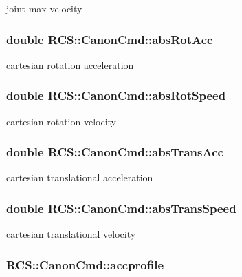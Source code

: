 joint max velocity \hypertarget{structRCS_1_1CanonCmd_ae1abe3a2d6c4c54776ad46738b3bf571}{
\subsubsection[{abs\-Rot\-Acc}]{\setlength{\rightskip}{0pt plus 5cm}double R\-C\-S\-::\-Canon\-Cmd\-::abs\-Rot\-Acc}}\label{structRCS_1_1CanonCmd_ae1abe3a2d6c4c54776ad46738b3bf571}
cartesian rotation acceleration \hypertarget{structRCS_1_1CanonCmd_ad7ce99c4f8d61314aef30c376ace79b7}{
\subsubsection[{abs\-Rot\-Speed}]{\setlength{\rightskip}{0pt plus 5cm}double R\-C\-S\-::\-Canon\-Cmd\-::abs\-Rot\-Speed}}\label{structRCS_1_1CanonCmd_ad7ce99c4f8d61314aef30c376ace79b7}
cartesian rotation velocity \hypertarget{structRCS_1_1CanonCmd_a129e91d931073194c3baaed83f56373e}{
\subsubsection[{abs\-Trans\-Acc}]{\setlength{\rightskip}{0pt plus 5cm}double R\-C\-S\-::\-Canon\-Cmd\-::abs\-Trans\-Acc}}\label{structRCS_1_1CanonCmd_a129e91d931073194c3baaed83f56373e}
cartesian translational acceleration \hypertarget{structRCS_1_1CanonCmd_abac67431174c72bbc8bc1e14916cba60}{
\subsubsection[{abs\-Trans\-Speed}]{\setlength{\rightskip}{0pt plus 5cm}double R\-C\-S\-::\-Canon\-Cmd\-::abs\-Trans\-Speed}}\label{structRCS_1_1CanonCmd_abac67431174c72bbc8bc1e14916cba60}
cartesian translational velocity \hypertarget{structRCS_1_1CanonCmd_a29d47510cc8f459cfa085ef9123bef22}{
\subsubsection[{accprofile}]{ R\-C\-S\-::\-Canon\-Cmd\-::accprofile}}\label{structRCS_1_1CanonCmd_a29d47510cc8f459cfa085ef9123bef22}
